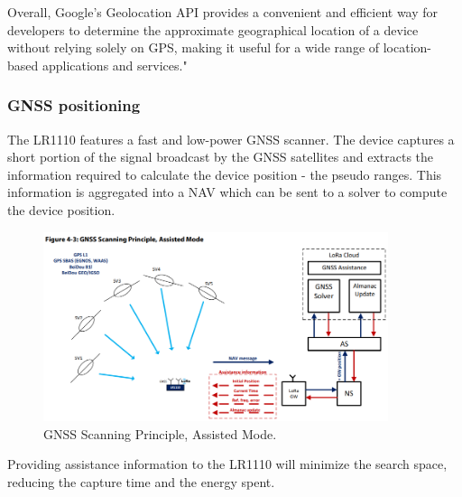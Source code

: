 Overall, Google's Geolocation API provides a convenient and efficient way for developers to determine the approximate geographical location of a device without relying solely on \ac{GPS}, making it useful for a wide range of location-based applications and services."


\subsubsection{GNSS positioning}

The LR1110 features a fast and low-power \ac{GNSS} scanner. The device captures a short portion of the signal broadcast by the
\ac{GNSS} satellites and extracts the information required to calculate the device position - the pseudo ranges. This information is aggregated into a \ac{NAV} which can be sent to a solver to compute the device position.

\begin{figure}[H]
    \centering
    \includegraphics[width=0.9\textwidth]{figures/GNSS_scanning.png}
    \caption{GNSS Scanning Principle, Assisted Mode.}
    \label{fig:gnss_scanning}
\end{figure}

Providing assistance information to the LR1110 will minimize the search space, reducing the capture time and the energy spent.

